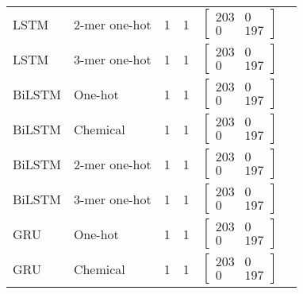 \begin{longtable}{llllll}
    LSTM & 2-mer one-hot & 1 & 1 & 
	$\begin{bmatrix}
        203 & 0\\ 
        0 & 197
    \end{bmatrix}$
    \\

    LSTM & 3-mer one-hot & 1 & 1 & 
	$\begin{bmatrix}
        203 & 0\\ 
        0 & 197
    \end{bmatrix}$
    \\\midrule
    

    BiLSTM & One-hot & 1 & 1 &
    $\begin{bmatrix}
        203 & 0\\ 
        0 & 197
    \end{bmatrix}$
    \\

    BiLSTM & Chemical & 1 & 1 &
    $\begin{bmatrix}
        203 & 0\\ 
        0 & 197
    \end{bmatrix}$
    \\

    BiLSTM & 2-mer one-hot & 1 & 1 &
    $\begin{bmatrix}
        203 & 0\\ 
        0 & 197
    \end{bmatrix}$
    \\

    BiLSTM & 3-mer one-hot & 1 & 1 &
    $\begin{bmatrix}
        203 & 0\\ 
        0 & 197
    \end{bmatrix}$
    \\\midrule
            

    GRU & One-hot & 1 & 1 &
    $\begin{bmatrix}
        203 & 0\\ 
        0 & 197
    \end{bmatrix}$
    \\

    GRU & Chemical & 1 & 1 &
    $\begin{bmatrix}
        203 & 0\\ 
        0 & 197
    \end{bmatrix}$
    \\


\end{longtable}
